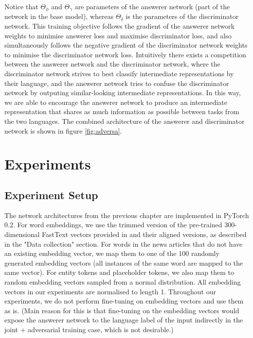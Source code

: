 \documentclass[]{article}
\begin{document}
Notice that $\Theta_\phi$ and $\Theta_\gamma$ are parameters of the answerer network (part of the network in the base model), whereas $\Theta_\delta$ is the parameters of the discriminator network. This training objective follows the gradient of the answerer network weights to minimise answerer loss and maximise discriminator loss, and also simultaneously follows the negative gradient of the discriminator network weights to minimise the discriminator network loss. Intuitively there exists a competition between the answerer network and the discriminator network, where the discriminator network strives to best classify intermediate representations by their language, and the answerer network tries to confuse the discriminator network by outputing similar-looking intermediate representations. In this way, we are able to encourage the answerer network to produce an intermediate representation that shares as much information as possible between tasks from the two languages. The combined architecture of the answerer and discriminator network is shown in figure \ref{fig:adversa}.

\section{Experiments}

\subsection{Experiment Setup}

The network architectures from the previous chapter are implemented in PyTorch 0.2. For word embeddings, we use the trimmed version of the pre-trained 300-dimensional FastText vectors provided in \cite{bojanowski2016enriching} and their aligned versions, as described in the "Data collection" section. For words in the news articles that do not have an existing embedding vector, we map them to one of the 100 randomly generated embedding vectors (all instances of the same word are mapped to the same vector). For entity tokens and placeholder tokens, we also map them to random embedding vectors sampled from a normal distribution. All embedding vectors in our experiments are normalised to length 1. Throughout our experiments, we do not perform fine-tuning on embedding vectors and use them as is. (Main reason for this is that fine-tuning on the embedding vectors would expose the answerer network to the language label of the input indirectly in the joint + adversarial training case, which is not desirable.)
\end{document}
